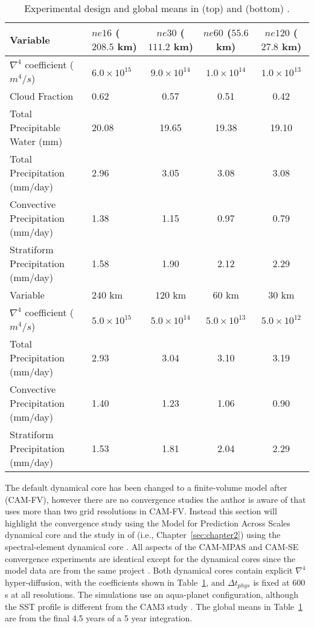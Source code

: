  \begin{table}
 \caption{Experimental design and global means in (top) \cite{HR2017JCLIM} and (bottom) \cite{RETAL2013JCLIM}.}
 \centering
 \scriptsize
 \begin{tabular}{llccc}
 \hline
Variable & $ne16$ ($208.5$ km) & $ne30$ ($111.2$ km) & $ne60$ ($55.6$ km) & $ne120$ ($27.8$ km)\\
   \hline
   $\nabla^{4}$ coefficient ($m^4/s$) & $6.0 \times 10^{15}$ & $9.0 \times 10^{14}$ & $1.0 \times 10^{14}$ & $1.0 \times 10^{13}$ \\
   Cloud Fraction & 0.62 & 0.57 & 0.51 & 0.42 \\ 
   Total Precipitable Water (mm) & 20.08 & 19.65 & 19.38 & 19.10 \\
   Total Precipitation (mm/day) & 2.96 & 3.05 & 3.08 & 3.08 \\
   Convective Precipitation (mm/day) & 1.38 & 1.15 & 0.97 & 0.79 \\
   Stratiform Precipitation (mm/day) & 1.58 & 1.90 & 2.12 & 2.29 \\      
 \hline
 Variable & $240$ km & $120$ km & $60$ km & $30$ km\\
 \hline
   $\nabla^{4}$ coefficient ($m^4/s$) & $5.0 \times 10^{15}$ & $5.0 \times 10^{14}$ & $5.0 \times 10^{13}$ & $5.0 \times 10^{12}$ \\      
   Total Precipitation (mm/day) & 2.93 & 3.04 & 3.10 & 3.19 \\
   Convective Precipitation (mm/day) & 1.40 & 1.23 & 1.06 & 0.90 \\
   Stratiform Precipitation (mm/day) & 1.53 & 1.81 & 2.04 & 2.29 \\
 \hline
 \end{tabular}
 \label{tbl:table1-4}
 \end{table}

The default dynamical core has been changed to a finite-volume model after \cite{L2004MWR} (CAM-FV), however there are no convergence studies the author is aware of that uses more than two grid resolutions in CAM-FV. Instead this section will highlight the convergence study \cite{RETAL2013JCLIM} using the Model for Prediction Across Scales dynamical core \citep[CAM-MPAS;][]{Ringler:2008} and the study in of \cite{HR2017JCLIM} (i.e., Chapter~\ref{sec:chapter2}) using the spectral-element dynamical core \citep[CAM-SE;][]{TF2010JCP,DetAl2012IJHPCA}. All aspects of the CAM-MPAS and CAM-SE convergence experiments are identical except for the dynamical cores since the model data are from the same project \citep{L2013EOS}. Both dynamical cores contain explicit $\nabla^4$ hyper-diffusion, with the coefficients shown in Table~\ref{tbl:table1-4}, and $\Delta t_{phys}$ is fixed at 600 s at all resolutions. The simulations use an aqua-planet configuration, although the SST profile \citep[`QOBS' in][]{NH2000ASL} is different from the CAM3 study \citep{W2008TELLUS}. The global means in Table~\ref{tbl:table1-4} are from the final 4.5 years of a 5 year integration.

